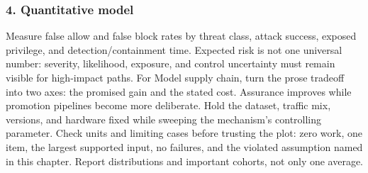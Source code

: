 \subsubsection*{4. Quantitative model}
Measure false allow and false block rates by threat class, attack success, exposed privilege, and detection/containment time. Expected risk is not one universal number: severity, likelihood, exposure, and control uncertainty must remain visible for high-impact paths.
For Model supply chain, turn the prose tradeoff into two axes: the promised gain and the stated cost. Assurance improves while promotion pipelines become more deliberate. Hold the dataset, traffic mix, versions, and hardware fixed while sweeping the mechanism's controlling parameter.
Check units and limiting cases before trusting the plot: zero work, one item, the largest supported input, no failures, and the violated assumption named in this chapter. Report distributions and important cohorts, not only one average.
